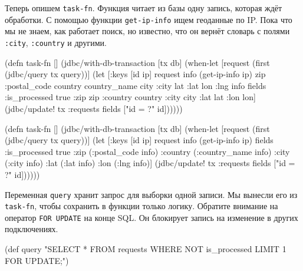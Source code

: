 Теперь опишем \verb|task-fn|. Функция читает из базы одну запись, которая
ждёт обработки. С помощью функции \verb|get-ip-info| ищем геоданные по
IP. Пока что мы не знаем, как работает поиск, но известно, что он вернёт словарь
с полями \verb|:city|, \verb|:country| и другими.


\ifnarrow

\begin{english}
  \begin{clojure/lines}
(defn task-fn []
 (jdbc/with-db-transaction [tx db]
  (when-let [request
             (first
              (jdbc/query tx query))]
    (let [{:keys [id ip]} request
          info   (get-ip-info ip)
          {zip :postal_code
           country country_name
           city :city lat :lat
           lon :lng} info
          fields {:is_processed true
                  :zip zip
                  :country country
                  :city city
                  :lat lat
                  :lon lon}]
      (jdbc/update! tx :requests
        fields ["id = ?" id])))))
  \end{clojure/lines}
\end{english}

\else

\begin{english}
  \begin{clojure/lines}
(defn task-fn []
  (jdbc/with-db-transaction [tx db]
    (when-let [request (first (jdbc/query tx query))]
      (let [{:keys [id ip]} request
            info   (get-ip-info ip)
            fields {:is_processed true
                    :zip (:postal_code info)
                    :country (:country_name info)
                    :city (:city info)
                    :lat (:lat info)
                    :lon (:lng info)}]
        (jdbc/update! tx :requests
                      fields
                      ["id = ?" id])))))
  \end{clojure/lines}
\end{english}

\fi


Переменная \verb|query| хранит запрос для выборки одной записи. Мы вынесли его
из \verb|task-fn|, чтобы сохранить в функции только логику. Обратите внимание на
оператор \verb|FOR UPDATE| на конце SQL. Он блокирует запись на изменение в
других подключениях.

\ifnarrow

\begin{english}
  \begin{clojure}
(def query
  "SELECT * FROM requests
   WHERE NOT is_processed
   LIMIT 1 FOR UPDATE;")
  \end{clojure}
\end{english}

